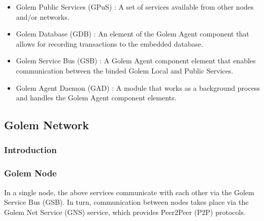 \begin{itemize}
\item Golem Public Services (GPuS) : A set of services available from other nodes and/or networks.

\item Golem Database (GDB) : An element of the Golem Agent component that allows for recording transactions to the embedded database.

\item Golem Service Bus (GSB) : A Golem Agent component element that enables communication between the binded Golem Local and Public Services.

\item Golem Agent Daemon (GAD) : A module that works as a background process and handles the Golem Agent component elements.

\end{itemize}

\break
\newpage

\subsection{Golem Network}

\subsubsection{Introduction}




\subsubsection{Golem Node}










In a single node, the above services communicate with each other via the Golem Service Bus (GSB).
In turn, communication between nodes takes place via the Golem Net Service (GNS) service, which provides Peer2Peer (P2P) protocols.

